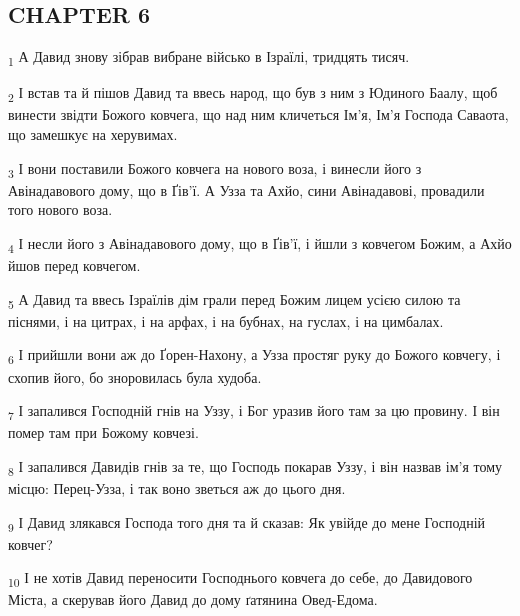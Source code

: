 \subsection{CHAPTER 6}
\begin{tcolorbox}
\textsubscript{1} А Давид знову зібрав вибране військо в Ізраїлі, тридцять тисяч.
\end{tcolorbox}
\begin{tcolorbox}
\textsubscript{2} І встав та й пішов Давид та ввесь народ, що був з ним з Юдиного Баалу, щоб винести звідти Божого ковчега, що над ним кличеться Ім'я, Ім'я Господа Саваота, що замешкує на херувимах.
\end{tcolorbox}
\begin{tcolorbox}
\textsubscript{3} І вони поставили Божого ковчега на нового воза, і винесли його з Авінадавового дому, що в Ґів'ї. А Узза та Ахйо, сини Авінадавові, провадили того нового воза.
\end{tcolorbox}
\begin{tcolorbox}
\textsubscript{4} І несли його з Авінадавового дому, що в Ґів'ї, і йшли з ковчегом Божим, а Ахйо йшов перед ковчегом.
\end{tcolorbox}
\begin{tcolorbox}
\textsubscript{5} А Давид та ввесь Ізраїлів дім грали перед Божим лицем усією силою та піснями, і на цитрах, і на арфах, і на бубнах, на гуслах, і на цимбалах.
\end{tcolorbox}
\begin{tcolorbox}
\textsubscript{6} І прийшли вони аж до Ґорен-Нахону, а Узза простяг руку до Божого ковчегу, і схопив його, бо зноровилась була худоба.
\end{tcolorbox}
\begin{tcolorbox}
\textsubscript{7} І запалився Господній гнів на Уззу, і Бог уразив його там за цю провину. І він помер там при Божому ковчезі.
\end{tcolorbox}
\begin{tcolorbox}
\textsubscript{8} І запалився Давидів гнів за те, що Господь покарав Уззу, і він назвав ім'я тому місцю: Перец-Узза, і так воно зветься аж до цього дня.
\end{tcolorbox}
\begin{tcolorbox}
\textsubscript{9} І Давид злякався Господа того дня та й сказав: Як увійде до мене Господній ковчег?
\end{tcolorbox}
\begin{tcolorbox}
\textsubscript{10} І не хотів Давид переносити Господнього ковчега до себе, до Давидового Міста, а скерував його Давид до дому ґатянина Овед-Едома.
\end{tcolorbox}
